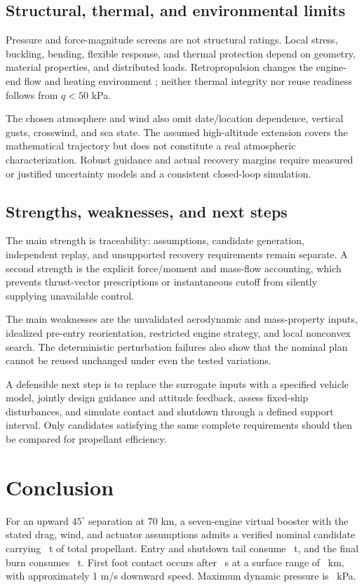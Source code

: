\documentclass[11pt,a4paper]{article}
\begin{document}
\subsection{Structural, thermal, and environmental limits}
Pressure and force-magnitude screens are not structural ratings. Local stress, buckling, bending, flexible response, and thermal protection depend on geometry, material properties, and distributed loads. Retropropulsion changes the engine-end flow and heating environment \cite{retro}; neither thermal integrity nor reuse readiness follows from $q<50$ kPa.

The chosen atmosphere and wind also omit date/location dependence, vertical gusts, crosswind, and sea state. The assumed high-altitude extension covers the mathematical trajectory but does not constitute a real atmospheric characterization. Robust guidance and actual recovery margins require measured or justified uncertainty models and a consistent closed-loop simulation.

\subsection{Strengths, weaknesses, and next steps}
The main strength is traceability: assumptions, candidate generation, independent replay, and unsupported recovery requirements remain separate. A second strength is the explicit force/moment and mass-flow accounting, which prevents thrust-vector prescriptions or instantaneous cutoff from silently supplying unavailable control.

The main weaknesses are the unvalidated aerodynamic and mass-property inputs, idealized pre-entry reorientation, restricted engine strategy, and local nonconvex search. The deterministic perturbation failures also show that the nominal plan cannot be reused unchanged under even the tested variations.

A defensible next step is to replace the surrogate inputs with a specified vehicle model, jointly design guidance and attitude feedback, assess fixed-ship disturbances, and simulate contact and shutdown through a defined support interval. Only candidates satisfying the same complete requirements should then be compared for propellant efficiency.

\section{Conclusion}
\label{sec:conclusion}
For an upward $45^\circ$ separation at 70 km, a seven-engine virtual booster with the stated drag, wind, and actuator assumptions admits a verified nominal candidate carrying \Load\ t of total propellant. Entry and shutdown tail consume \EntryFuel\ t, and the final burn consumes \LandingFuel\ t. First foot contact occurs after \FlightTime\ s at a surface range of \Range\ km, with approximately 1 m/s downward speed. Maximum dynamic pressure is \PeakQ\ kPa.
\end{document}
